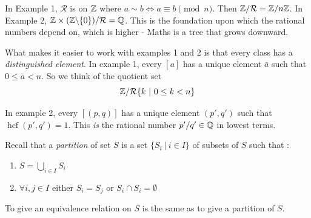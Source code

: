 \documentclass[10pt]{scrartcl}
\DeclareMathOperator{\hcf}{hcf}
\newcommand{\rel}{\mathcal{R}}
\begin{document}
In Example 1, $\rel$ is on $\mathbb{Z}$ where $a \sim b \iff a \equiv b \pmod{n}$. Then $\Z/\rel = \Z/n\Z$. In Example 2, $\Z \times(\Z\backslash\{0\}) /\rel = \Q$. This is the foundation upon which the rational numbers depend on, which is higher - Maths is a tree that grows downward.  \\

\begin{remark}
What makes it easier to work with examples 1 and 2 is that every class has a \emph{distinguished element}. In example 1, every $[a]$ has a unique element $\bar{a}$ such that $ 0\leq \bar{a} < n$. So we think of the quotient set 
\[\Z /\rel \{k ~|~ 0 \leq k < n\}\]	

In example 2, every $[(p,q)]$ has a unique element $(p',q')$ such that $\hcf(p',q') = 1$. This \emph{is} the rational number $p'/q' \in \mathbb{Q}$ in lowest terms. 
\end{remark}

Recall that a \emph{partition} of set $S$ is a set $\{S_i ~|~ i \in I\}$ of subsets of $S$ such that : 
\begin{enumerate}
\item $S = \bigcup_{i \in I} S_i$
\item $\forall i,j \in I$ either $S_i = S_j$ or $S_i \cap S_i = \emptyset$	
\end{enumerate}\vspace*{5pt}




\begin{theorem}
To give an equivalence relation on $S$ is the same as to give a partition of $S$. 	
\end{theorem}
\end{document}
